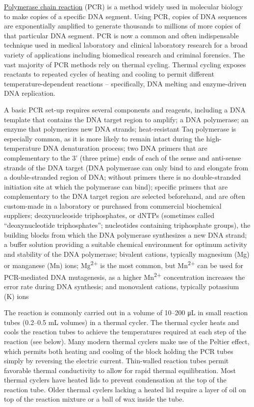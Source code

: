 \href{https://en.wikipedia.org/wiki/Polymerase_chain_reaction}{Polymerase chain reaction} (PCR) is a method widely used in molecular biology to make copies of a specific DNA segment. Using PCR, copies of DNA sequences are exponentially amplified to generate thousands to millions of more copies of that particular DNA segment. PCR is now a common and often indispensable technique used in medical laboratory and clinical laboratory research for a broad variety of applications including biomedical research and criminal forensics. The vast majority of PCR methods rely on thermal cycling. Thermal cycling exposes reactants to repeated cycles of heating and cooling to permit different temperature-dependent reactions -- specifically, DNA melting and enzyme-driven DNA replication.

A basic PCR set-up requires several components and reagents, including a DNA template that contains the DNA target region to amplify; a DNA polymerase; an enzyme that polymerizes new DNA strands; heat-resistant Taq polymerase is especially common, as it is more likely to remain intact during the high-temperature DNA denaturation process; two DNA primers that are complementary to the 3' (three prime) ends of each of the sense and anti-sense strands of the DNA target (DNA polymerase can only bind to and elongate from a double-stranded region of DNA; without primers there is no double-stranded initiation site at which the polymerase can bind); specific primers that are complementary to the DNA target region are selected beforehand, and are often custom-made in a laboratory or purchased from commercial biochemical suppliers; deoxynucleoside triphosphates, or dNTPs (sometimes called ``deoxynucleotide triphosphates''; nucleotides containing triphosphate groups), the building blocks from which the DNA polymerase synthesizes a new DNA strand; a buffer solution providing a suitable chemical environment for optimum activity and stability of the DNA polymerase; bivalent cations, typically magnesium (Mg) or manganese (Mn) ions; Mg\textsuperscript{2+} is the most common, but Mn\textsuperscript{2+} can be used for PCR-mediated DNA mutagenesis, as a higher Mn\textsuperscript{2+} concentration increases the error rate during DNA synthesis; and monovalent cations, typically potassium (K) ions

The reaction is commonly carried out in a volume of 10--200 μL in small reaction tubes (0.2--0.5 mL volumes) in a thermal cycler. The thermal cycler heats and cools the reaction tubes to achieve the temperatures required at each step of the reaction (see below). Many modern thermal cyclers make use of the Peltier effect, which permits both heating and cooling of the block holding the PCR tubes simply by reversing the electric current. Thin-walled reaction tubes permit favorable thermal conductivity to allow for rapid thermal equilibration. Most thermal cyclers have heated lids to prevent condensation at the top of the reaction tube. Older thermal cyclers lacking a heated lid require a layer of oil on top of the reaction mixture or a ball of wax inside the tube.

